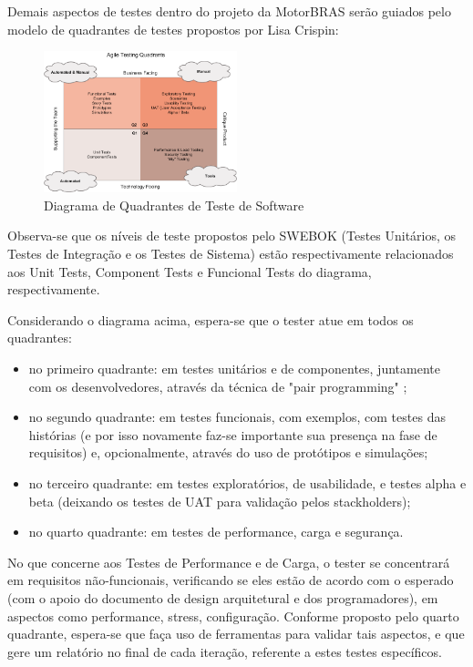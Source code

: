 \documentclass[12pt,journal,compsoc]{IEEEtran}
\begin{document}
Demais aspectos de testes dentro do projeto da MotorBRAS serão guiados pelo modelo de quadrantes de testes propostos por Lisa Crispin: \cite{agile_testing}

\begin{figure}[ht!]
\centering
\includegraphics[width=0.5\textwidth]{agile_testing_quadrants}
\caption{Diagrama de Quadrantes de Teste de Software \cite{agile_testing}}
\label{fig:agile_testing_quadrants}
\end{figure}

Observa-se que os níveis de teste propostos pelo SWEBOK \cite{society_software_2004} (Testes Unitários, os Testes de Integração e os Testes de Sistema) estão respectivamente relacionados aos Unit Tests, Component Tests e Funcional Tests do diagrama, respectivamente.

Considerando o diagrama acima, espera-se que o tester atue em todos os quadrantes:

\begin{itemize}
\item no primeiro quadrante: em testes unitários e de componentes, juntamente com os desenvolvedores, através da técnica de "pair programming" \cite{pairprogramming};
\item no segundo quadrante: em testes funcionais, com exemplos, com testes das histórias (e por isso novamente faz-se importante sua presença na fase de requisitos) e, opcionalmente, através do uso de protótipos e simulações;
\item no terceiro quadrante: em testes exploratórios, de usabilidade, e testes alpha e beta (deixando os testes de UAT para validação pelos stackholders);
\item no quarto quadrante: em testes de performance, carga e segurança.
\end{itemize}

No que concerne aos Testes de Performance e de Carga, o tester se concentrará em requisitos não-funcionais, verificando se eles estão de acordo com o esperado (com o apoio do documento de design arquitetural e dos programadores), em aspectos como performance, stress, configuração. Conforme proposto pelo quarto quadrante, espera-se que faça uso de ferramentas para validar tais aspectos, e que gere um relatório no final de cada iteração, referente a estes testes específicos.
\end{document}
